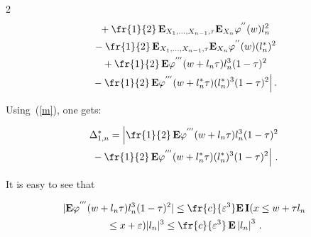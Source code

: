 \begin{multicols}{2}
\begin{multline*}
{}+\fr{1}{2}\,

    \mathbf{E}_{X_1,\ldots,X_{n-1},\tau} \mathbf{E}_{X_{n}}\varphi^{''}(w)l_n^2\\

    {}-

    \fr{1}{2}\,\mathbf{E}_{X_1,\ldots,X_{n-1},\tau} \mathbf{E}_{X_{n}}\varphi^{''}(w)(l_n^{*})^2\\

{}+

    \fr{1}{2}\,\mathbf{E}\varphi^{'''}(w+l_n\tau )l_n^3(1-\tau)^{2}\\

    {}-

    \fr{1}{2}\,\mathbf{E}\varphi^{'''}(w+l_n^{*}\tau)(l_n^{*})^3(1-\tau)^{2}\Big|\,.

    \end{multline*}

    Using~(\ref{m}), one gets:

    

    \noindent

     \begin{multline}

     \label{e11-y}

    \Delta^{*}_{1,n}=\left\vert\fr{1}{2}\,\mathbf{E}\varphi^{'''}(w+l_n\tau)l_n^3(1-\tau)^{2}\right.\\

\left.    {}-

    \fr{1}{2}\,\mathbf{E}\varphi^{'''}(w+l_n^{*}\tau)(l_n^{*})^3(1-\tau)^{2}\right\vert\,.

    \end{multline}

    It is easy to see that

    

    \noindent

    \begin{multline*}

    |\mathbf{E}\varphi^{'''}(w+l_n\tau)l_n^3(1-\tau)^{2}|\leq 

    \fr{c}{\varepsilon^{3}}\mathbf{E} \,    \mathbf{I}(x\leq w+\tau l_n\\

    {}\leq x

    +\varepsilon)|l_{n}|^{3}\leq \fr{c}{\varepsilon^{3}}\,\mathbf{E} 

    \left\vert l_{n}\right\vert^{3}\,.

    \end{multline*}




\end{multicols}
